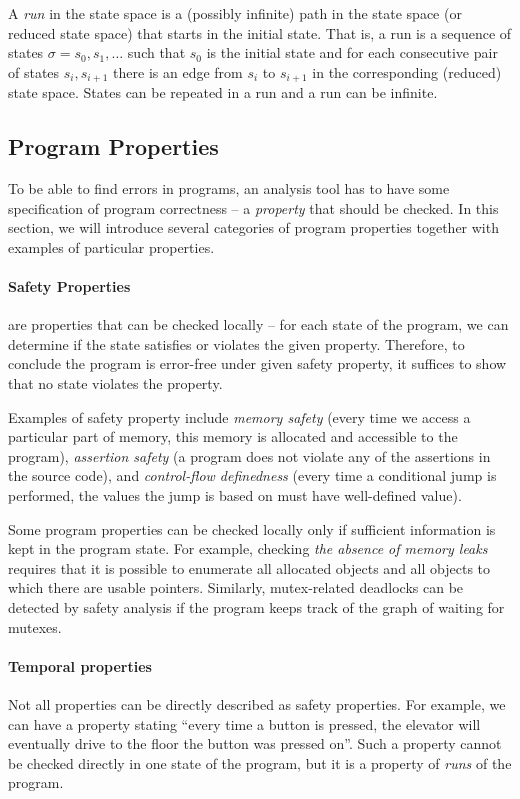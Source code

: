 \begin{definition}[Run]
A \emph{run} in the state space is a (possibly infinite) path in the state space (or reduced state space) that starts in the initial state.
That is, a run is a sequence of states $\sigma = s_0, s_1, …$ such that $s_0$ is the initial state and for each consecutive pair of states $s_i, s_{i+1}$ there is an edge from $s_i$ to $s_{i + 1}$ in the corresponding (reduced) state space.
States can be repeated in a run and a run can be infinite.
\end{definition}

\subsection{Program Properties}

To be able to find errors in programs, an analysis tool has to have
some specification of program correctness -- a \emph{property} that should be
checked.
In this section, we will introduce several categories of program properties
together with examples of particular properties.

\paragraph{Safety Properties}
%
are properties that can be checked locally -- for each state of the program, we
can determine if the state satisfies or violates the given property.
Therefore, to conclude the program is error-free under given safety property, it suffices to show that no state violates the property.

Examples of safety property include \emph{memory safety} (every
time we access a particular part of memory, this memory is allocated and
accessible to the program), \emph{assertion safety} (a program
does not violate any of the assertions in the source code), and
\emph{control-flow definedness} (every time a conditional jump is
performed, the values the jump is based on must have well-defined value).

Some program properties can be checked locally only if sufficient information
is kept in the program state.
For example, checking \emph{the absence of memory leaks} requires that it is
possible to enumerate all allocated objects and all objects to which there are
usable pointers.
Similarly, mutex-related deadlocks can be detected by safety analysis if the program keeps track of the graph of waiting for mutexes.

\paragraph{Temporal properties}
%
Not all properties can be directly described as safety properties.
For example, we can have a property stating ``every time a button is pressed, the elevator will eventually drive to the floor the button was pressed on''.
Such a property cannot be checked directly in one state of the program, but it is a property of \emph{runs} of the program.

